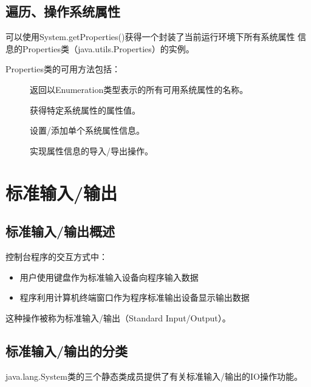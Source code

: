 \subsection{遍历、操作系统属性}

可以使用System.getProperties()获得一个封装了当前运行环境下所有系统属性
信息的Properties类（java.utils.Properties）的实例。


Properties类的可用方法包括：

\begin{description}
\item [] 返回以Enumeration类型表示的所有可用系统属性的名称。
\item [] 获得特定系统属性的属性值。
\item [] 设置/添加单个系统属性信息。
\item [] 
\item [] 实现属性信息的导入/导出操作。
\end{description}

\section{标准输入/输出}

\subsection{标准输入/输出概述}

控制台程序的交互方式中：

\begin{itemize}
\item 用户使用键盘作为{\hei 标准输入设备}向程序输入数据
\item 程序利用计算机终端窗口作为{\hei 程序标准输出设备}显示输出数据
\end{itemize}

这种操作被称为{\hei 标准输入/输出（Standard Input/Output）}。

\subsection{标准输入/输出的分类}

java.lang.System类的三个静态类成员提供了有关标准输入/输出的IO操作功能。

